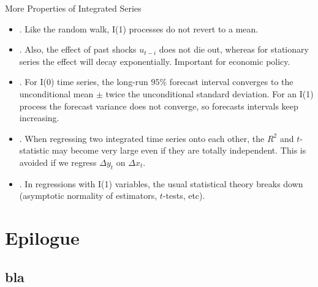 \begin{frame}{More Properties of Integrated Series}
\begin{itemize}

\item {}. Like the random walk, I(1) processes do not revert to a mean.
\item {}. Also,
the effect of past shocks $u_{t-i}$ does not die out, whereas for stationary
series the effect will decay exponentially. Important for
economic policy.

\item {}. For I(0)
time series, the long-run $95\%$ forecast interval converges to the
unconditional mean $\pm$ twice the unconditional standard
deviation. For an I(1) process the forecast variance does
not converge, so forecasts intervals keep increasing.

\item {}. When regressing two
integrated time series onto each other, the $R^{2}$ and $t$-statistic may become very
large even if they are totally independent. This is avoided if we regress $%
\Delta y_{t}$ on $\Delta x_{t}$.

\item {}. In regressions with I(1) variables, the usual statistical theory breaks down (asymptotic normality of estimators, $t$-tests, etc).
\end{itemize}
\end{frame}





\section{Epilogue}\subsection*{bla}

